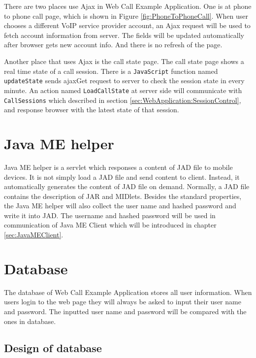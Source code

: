 There are two places use Ajax in Web Call Example Application. One is at phone to phone call page, which is shown in Figure \ref{fig:PhoneToPhoneCall}. When user chooses a different VoIP service provider account, an Ajax request will be used to fetch account information from server. The fields will be updated automatically after browser gets new account info. And there is no refresh of the page. 

Another place that uses Ajax is the call state page. The call state page shows a real time state of a call session. There is a \texttt{JavaScript} function named \texttt{updateState} sends ajaxGet request to server to check the session state in every minute. An action named \texttt{LoadCallState} at server side will communicate with \texttt{CallSessions} which described in section \ref{sec:WebApplication:SessionControl}, and response browser with the latest state of that session.

\section{Java ME helper}
\label{sec:WebApplication:JavaMEHelper}

Java ME helper is a servlet which responses a content of JAD file to mobile devices. It is not simply load a JAD file and send content to client. Instead, it automatically generates the content of JAD file on demand. Normally, a JAD file contains the description of JAR and MIDlets. Besides the standard properties, the Java ME helper will also collect the user name and hashed password and write it into JAD. The username and hashed password will be used in communication of Java ME Client which will be introduced in chapter \ref{sec:JavaMEClient}.

\section{Database}
\label{sec:WebApplication:Database}

The database of Web Call Example Application stores all user information. When users login to the web page they will always be asked to input their user name and password. The inputted user name and password will be compared with the ones in database. 

\subsection{Design of database}
\label{sec:WebApplication:Database:DesignOfDatabase}


